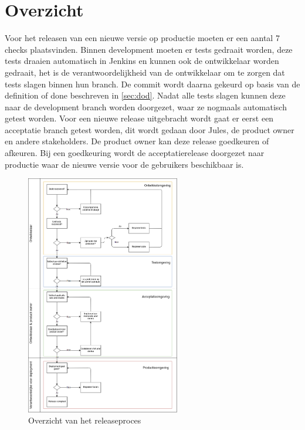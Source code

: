 \section{Overzicht}
Voor het releasen van een nieuwe versie op productie moeten er een aantal 7 checks plaatsvinden.
Binnen development moeten er tests gedraait worden, deze tests draaien automatisch in Jenkins en kunnen ook de ontwikkelaar worden gedraait, het is de verantwoordelijkheid van de ontwikkelaar om te zorgen dat tests slagen binnen hun branch.
De commit wordt daarna gekeurd op basis van de definition of done beschreven in \cref{sec:dod}.
Nadat alle tests slagen kunnen deze naar de development branch worden doorgezet, waar ze nogmaals automatisch getest worden.
Voor een nieuwe release uitgebracht wordt gaat er eerst een acceptatie branch getest worden, dit wordt gedaan door Jules, de product owner en andere stakeholders.
De product owner kan deze release goedkeuren of afkeuren. Bij een goedkeuring wordt de acceptatierelease doorgezet naar productie waar de nieuwe versie voor de gebruikers beschikbaar is.
\begin{figure}[h]
	\centering\includegraphics[width=0.6\textwidth]{images/ReleaseUML.png}
	\caption{Overzicht van het releaseproces}
\end{figure}

